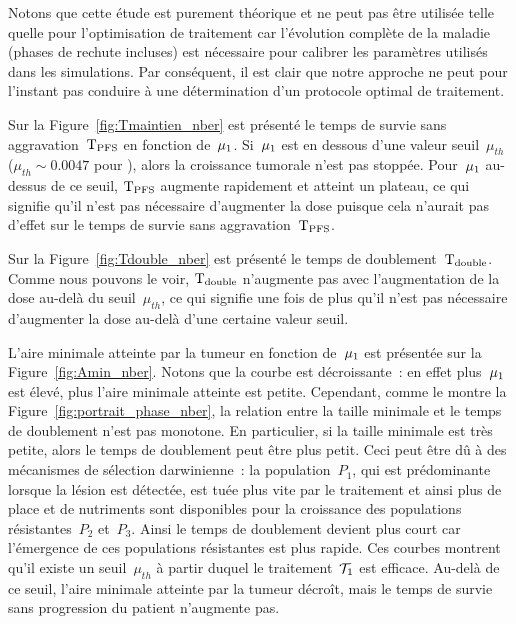 \documentclass[main.tex]{subfiles}
\begin{document}
Notons que cette étude est purement théorique et ne peut pas être utilisée telle quelle pour l'optimisation de traitement car l'évolution complète de la maladie (phases de rechute incluses) est nécessaire pour calibrer les paramètres utilisés dans les simulations. Par conséquent, il est clair que notre approche ne peut pour l'instant pas conduire à une détermination d'un protocole optimal de traitement. 


Sur la Figure~\ref{fig:Tmaintien_nber} est présenté le temps de survie sans aggravation~${\rm T_{PFS}}$ en fonction de~$\mu_1$. 
Si~$\mu_1$ est en dessous d'une valeur seuil~$\mu_{th}$ ($\mu_{th}\sim 0.0047$ pour \Nber), alors la croissance tumorale n'est pas stoppée.  
Pour~$\mu_1$ au-dessus de ce seuil, ${\rm T_{PFS}}$ augmente rapidement et atteint un plateau, ce qui signifie qu'il n'est pas nécessaire d'augmenter la dose puisque cela n'aurait pas d'effet sur  le temps de survie sans aggravation~${\rm T_{PFS}}$.

Sur la Figure~\ref{fig:Tdouble_nber} est présenté le temps de doublement~${\rm T_{double}}$. 
Comme nous pouvons le voir, ${\rm T_{double}}$ n'augmente pas avec l'augmentation de la dose au-delà du seuil~$\mu_{th}$, ce qui signifie une fois de plus qu'il n'est pas nécessaire d'augmenter la dose au-delà d'une certaine valeur seuil.


L'aire minimale atteinte par la tumeur en fonction de~$\mu_1$ est présentée sur la Figure~\ref{fig:Amin_nber}. Notons que la courbe est décroissante~: en effet plus~$\mu_1$ est élevé, plus l'aire minimale atteinte est petite. Cependant, comme le montre la  Figure~\ref{fig:portrait_phase_nber}, la relation entre la taille minimale et le temps de doublement n'est pas monotone. En particulier, si la taille minimale est très petite, alors le temps de doublement peut être plus petit.  
Ceci peut être dû à des mécanismes de sélection darwinienne~: 
la population~$P_1$, qui est prédominante lorsque la lésion est détectée, est tuée plus vite par le traitement et ainsi plus de place et de nutriments sont disponibles pour la croissance des populations résistantes~$P_2$ et~$P_3$. Ainsi le temps de doublement devient plus court car l'émergence de ces populations résistantes est plus rapide. 
Ces courbes montrent qu'il existe un seuil~$\mu_{th}$ à partir duquel le traitement~$\mathcal{T}_1$ est efficace. Au-delà de ce seuil, l'aire minimale atteinte par la tumeur décroît, mais le temps de survie sans progression du patient n'augmente pas.
\end{document}
